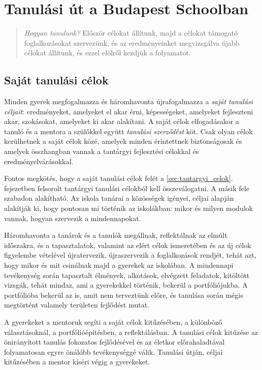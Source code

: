 \chapter{Tanulási út a Budapest Schoolban}

\begin{quote}
\emph{Hogyan tanulunk?}
Először célokat állítunk, majd a célokat támogató
foglalkozásokat szervezünk, és az eredményeinket megvizsgálva újabb
célokat állítunk, és ezzel elölről kezdjük a folyamatot.
\end{quote}

\section{Saját tanulási célok}

Minden gyerek megfogalmazza és háromhavonta újrafogalmazza a \emph{saját tanulási céljait}: eredményeket, amelyeket el akar érni, képességeket, amelyeket fejleszteni akar, szokásokat, amelyeket ki akar alakítani. A saját célok elfogadásakor a tanuló és a mentora a szülőkkel együtt \emph{tanulási szerződést} köt. Csak olyan célok kerülhetnek a saját célok közé, amelyek minden érintettnek biztonságosak és amelyek összhangban vannak a tantárgyi fejlesztési célokkal és eredményelvárásokkal.

Fontos megkötés, hogy a saját tanulási célok felét a \ref{sec:tantargyi_celok}. fejezetben felsorolt tantárgyi tanulási célokból kell összeválogatni. A másik fele szabadon alakítható. Az iskola tanárai a közösségek igényei, céljai alapján alakítják ki, hogy pontosan mi történik az iskolákban: mikor és milyen modulok vannak, hogyan szervezik a mindennapokat.

Háromhavonta a tanárok és a tanulók megállnak, reflektálnak az elmúlt időszakra, és a tapasztalatok, valamint az elért célok ismeretében és az új célok figyelembe vételével újratervezik, újraszervezik a foglalkozások rendjét, tehát azt, hogy mikor és mit csinálnak majd a gyerekek az iskolában.
A mindennapi tevékenység során tapasztalt élmények, alkotások, elvégzett feladatok, kitöltött vizsgák, tehát mindaz, ami a gyerekekkel történik, bekerül a portfóliójukba. A portfólióba bekerül az is, amit nem terveztünk előre, és tanulása során mégis megtörtént valamely területen fejlődést mutat.

A gyerekeket a mentoruk segíti a saját célok kitűzésében, a különböző választásoknál, a portfólióépítésben, a reflektálásban. A tanulási célok kitűzése az önirányított tanulás fokozatos fejlődésével és az életkor előrahaladtával folyamatosan egyre önálóbb tevékenységgé válik. Tanulási  útján, céljai kitűzésében a mentor kíséri végig a gyerekeket.


